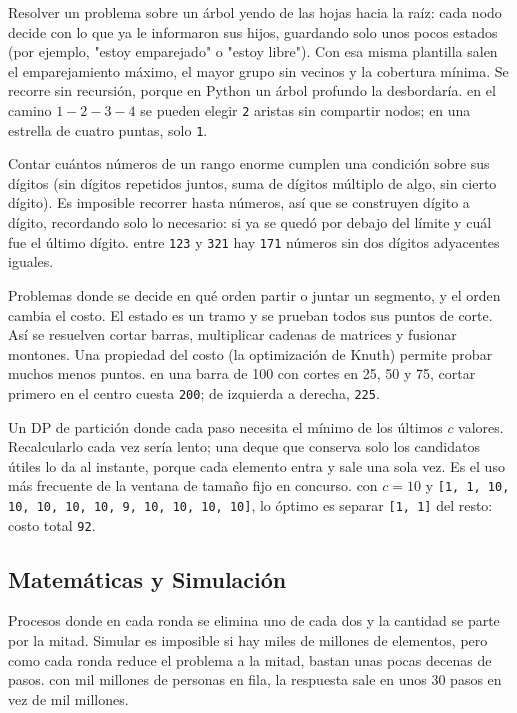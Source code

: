 Resolver un problema sobre un árbol yendo de las hojas hacia la raíz: cada nodo
decide con lo que ya le informaron sus hijos, guardando solo unos pocos estados
(por ejemplo, "estoy emparejado" o "estoy libre"). Con esa misma plantilla salen el
emparejamiento máximo, el mayor grupo sin vecinos y la cobertura mínima. Se recorre
sin recursión, porque en Python un árbol profundo la desbordaría.
\ej en el camino $1-2-3-4$ se pueden elegir \texttt{2} aristas sin compartir
nodos; en una estrella de cuatro puntas, solo \texttt{1}.

Contar cuántos números de un rango enorme cumplen una condición sobre sus dígitos
(sin dígitos repetidos juntos, suma de dígitos múltiplo de algo, sin cierto
dígito). Es imposible recorrer hasta  números, así que se construyen
dígito a dígito, recordando solo lo necesario: si ya se quedó por debajo del
límite y cuál fue el último dígito.
\ej entre \texttt{123} y \texttt{321} hay \texttt{171} números sin dos dígitos
adyacentes iguales.

Problemas donde se decide en qué orden partir o juntar un segmento, y el orden
cambia el costo. El estado es un tramo y se prueban todos sus puntos de corte. Así
se resuelven cortar barras, multiplicar cadenas de matrices y fusionar montones. Una
propiedad del costo (la optimización de Knuth) permite probar muchos menos puntos.
\ej en una barra de 100 con cortes en 25, 50 y 75, cortar primero en el centro
cuesta \texttt{200}; de izquierda a derecha, \texttt{225}.

Un DP de partición donde cada paso necesita el mínimo de los últimos $c$ valores.
Recalcularlo cada vez sería lento; una deque que conserva solo los candidatos útiles
lo da al instante, porque cada elemento entra y sale una sola vez. Es el uso más
frecuente de la ventana de tamaño fijo en concurso.
\ej con $c = 10$ y \texttt{[1, 1, 10, 10, 10, 10, 10, 9, 10, 10, 10, 10]}, lo
óptimo es separar \texttt{[1, 1]} del resto: costo total \texttt{92}.

\subsection*{Matemáticas y Simulación}

Procesos donde en cada ronda se elimina uno de cada dos y la cantidad se parte por
la mitad. Simular es imposible si hay miles de millones de elementos, pero como
cada ronda reduce el problema a la mitad, bastan unas pocas decenas de pasos.
\ej con mil millones de personas en fila, la respuesta sale en unos 30 pasos en
vez de mil millones.

